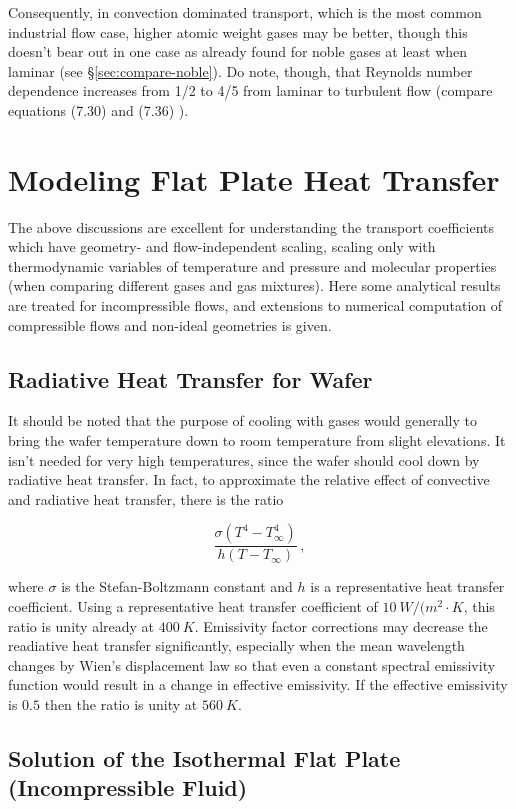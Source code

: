 \documentclass{article}
\begin{document}
Consequently, in convection dominated transport, which is the most common
industrial flow case, higher atomic weight gases may be better, though this
doesn't bear out in one case as already found for noble gases at least when
laminar (see \S \ref{sec:compare-noble}). Do note, though, that Reynolds number
dependence increases from 1/2 to 4/5 from laminar to turbulent flow (compare
equations (7.30) and (7.36) \cite{incropera1996fundamentals}).

\section{Modeling Flat Plate Heat Transfer}

The above discussions are excellent for understanding the transport
coefficients which have geometry- and flow-independent scaling, scaling only
with thermodynamic variables of temperature and pressure and molecular
properties (when comparing different gases and gas mixtures). Here some
analytical results are treated for incompressible flows, and extensions to
numerical computation of compressible flows and non-ideal geometries is given.

\subsection{Radiative Heat Transfer for Wafer}

It should be noted that the purpose of cooling with gases would generally to bring
the wafer temperature down to room temperature from slight elevations. It isn't
needed for very high temperatures, since the wafer should cool down by
radiative heat transfer. In fact, to approximate the relative effect of
convective and radiative heat transfer, there is the ratio

$$ \frac{\sigma (T^4 - T_\infty^4)}{h(T - T_\infty)} \,,$$

where $\sigma$ is the Stefan-Boltzmann constant and $h$ is a representative
heat transfer coefficient. Using a representative heat transfer coefficient of
$\SI{10}{W/(m^2\cdot K}$, this ratio is unity already at $\SI{400}{K}$. Emissivity factor
corrections may decrease the readiative heat transfer significantly, especially
when the mean wavelength changes by Wien's displacement law so that even a
constant spectral emissivity function would result in a change in effective
emissivity. If the effective emissivity is $0.5$ then the ratio is unity at $\SI{560}{K}$.

\subsection{Solution of the Isothermal Flat Plate (Incompressible Fluid)}\label{ref:incompressible-flat-plate}
\end{document}

